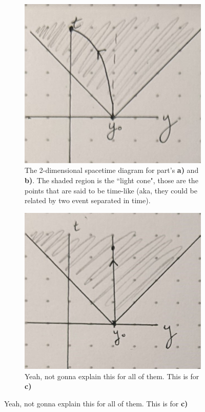 \documentclass[12pt]{article}
\begin{document}
\begin{enumerate}[label=\alph*)]
\begin{figure}[!ht]
\centering
	\begin{subfigure}{0.45\textwidth}
	\includegraphics[width=\textwidth]{gr_1.1.jpg}
	\caption{The 2-dimensional spacetime diagram for part's {\bf a)} and {\bf b)}. The shaded region is the ``light cone", those are the points that are said to be time-like (aka, they could be related by two event separated in time).}
	\label{fig:1.1}
	\end{subfigure}
	\hfill
	\begin{subfigure}{0.45\textwidth}
	\includegraphics[width=\textwidth]{gr_1.2.jpg}
	\caption{Yeah, not gonna explain this for all of them. This is for {\bf c)}}
	\label{fig:1.2}
	\end{subfigure}
\end{figure}


\end{enumerate}
\end{document}
